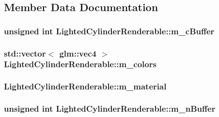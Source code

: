 \subsection{Member Data Documentation}
\hypertarget{classLightedCylinderRenderable_a2795079c02ff376e0b4a7e2507371d94}{
\subsubsection[{m\+\_\+c\+Buffer}]{\setlength{\rightskip}{0pt plus 5cm}unsigned int Lighted\+Cylinder\+Renderable\+::m\+\_\+c\+Buffer\hspace{0.3cm}{\ttfamily [private]}}}\label{classLightedCylinderRenderable_a2795079c02ff376e0b4a7e2507371d94}
\hypertarget{classLightedCylinderRenderable_a33d59e3d7e08b0123102624da0caa396}{
\subsubsection[{m\+\_\+colors}]{\setlength{\rightskip}{0pt plus 5cm}std\+::vector$<$ glm\+::vec4 $>$ Lighted\+Cylinder\+Renderable\+::m\+\_\+colors\hspace{0.3cm}{\ttfamily [private]}}}\label{classLightedCylinderRenderable_a33d59e3d7e08b0123102624da0caa396}
\hypertarget{classLightedCylinderRenderable_a69203c5141f12784a61ab3cefb885b3f}{
\subsubsection[{m\+\_\+material}]{ Lighted\+Cylinder\+Renderable\+::m\+\_\+material\hspace{0.3cm}{\ttfamily [private]}}}\label{classLightedCylinderRenderable_a69203c5141f12784a61ab3cefb885b3f}
\hypertarget{classLightedCylinderRenderable_abb74e2395d504a3393ba2b59276bf361}{
\subsubsection[{m\+\_\+n\+Buffer}]{\setlength{\rightskip}{0pt plus 5cm}unsigned int Lighted\+Cylinder\+Renderable\+::m\+\_\+n\+Buffer\hspace{0.3cm}{\ttfamily [private]}}}\label{classLightedCylinderRenderable_abb74e2395d504a3393ba2b59276bf361}
